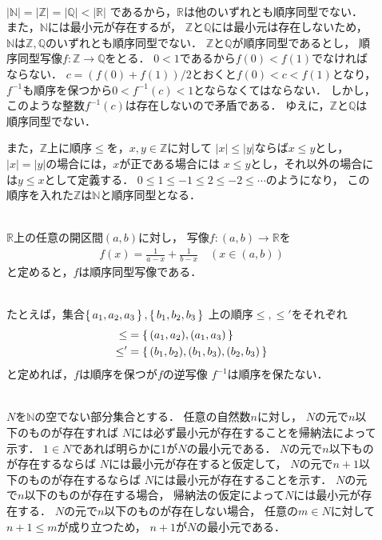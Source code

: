 \begin{description}
\item[] \mbox{} \\
  $\lvert \mathbb{N} \rvert = \lvert \mathbb{Z} \rvert 
  = \lvert \mathbb{Q} \rvert < \lvert \mathbb{R} \rvert$
  であるから，$\mathbb{R}$は他のいずれとも順序同型でない．
  また，$\mathbb{N}$には最小元が存在するが，
  $\mathbb{Z}$と$\mathbb{Q}$には最小元は存在しないため，
  $\mathbb{N}$は$\mathbb{Z}, \mathbb{Q}$のいずれとも順序同型でない．
  $\mathbb{Z}$と$\mathbb{Q}$が順序同型であるとし，
  順序同型写像$f: \mathbb{Z} \longrightarrow \mathbb{Q}$をとる．
  $0<1$であるから$f(0) < f(1)$でなければならない．
  $c= (f(0) + f(1))/2$とおくと$f(0) < c < f(1)$となり，
  $f^{-1}$も順序を保つから$0<f^{-1}(c)< 1$とならなくてはならない．
  しかし，このような整数$f^{-1}(c)$は存在しないので矛盾である．
  ゆえに，$\mathbb{Z}$と$\mathbb{Q}$は順序同型でない．

  また，$\mathbb{Z}$上に順序$\leq$を，$x , y \in \mathbb{Z}$に対して
  $\lvert x \rvert \leq \lvert y \rvert $ならば$x \leq y$とし，
  $\lvert x \rvert = \lvert y \rvert$の場合には，$x$が正である場合には
  $x \leq y$とし，それ以外の場合には$y \leq x$として定義する．
  $0 \leq 1 \leq -1 \leq 2 \leq -2 \leq \cdots $のようになり，
  この順序を入れた$\mathbb{Z}$は$\mathbb{N}$と順序同型となる．


\item[] \mbox{} \\
  $\mathbb{R}$上の任意の開区間$(a,b)$に対し，
  写像$f: (a,b)  \longrightarrow \mathbb{R}$を
  \begin{align*}
    f(x) = \frac{1}{a-x} + \frac{1}{b-x} \quad ( x \in (a,b) )
  \end{align*}
  と定めると，$f$は順序同型写像である．

\item[] \mbox{} \\
  たとえば，集合$\set{a_1,a_2,a_3} ,
  \set{b_1,b_2,b_3}$
  上の順序$\leq, \leq'$をそれぞれ
  \begin{align*}
    \leq & = \set{ (a_1,a_2) , (a_1,a_3)} \\
    \leq' & = \set{ (b_1,b_2) , (b_1,b_3) , (b_2,b_3)}
  \end{align*}
  と定めれば，$f$は順序を保つが$f$の逆写像
  $f^{-1}$は順序を保たない．



\item[] \mbox{} \\
  $N$を$\mathbb{N}$の空でない部分集合とする．
  任意の自然数$n$に対し，
  $N$の元で$n$以下のものが存在すれば
  $N$には必ず最小元が存在することを帰納法によって示す．
  $1 \in N$であれば明らかに1が$N$の最小元である．
  $N$の元で$n$以下ものが存在するならば
  $N$には最小元が存在すると仮定して，
  $N$の元で$n+1$以下のものが存在するならば
  $N$には最小元が存在することを示す．
  $N$の元で$n$以下のものが存在する場合，
  帰納法の仮定によって$N$には最小元が存在する．
  $N$の元で$n$以下のものが存在しない場合，
  任意の$m \in N$に対して$n+1 \leq m$が成り立つため，
  $n+1$が$N$の最小元である．
  

\end{description}
